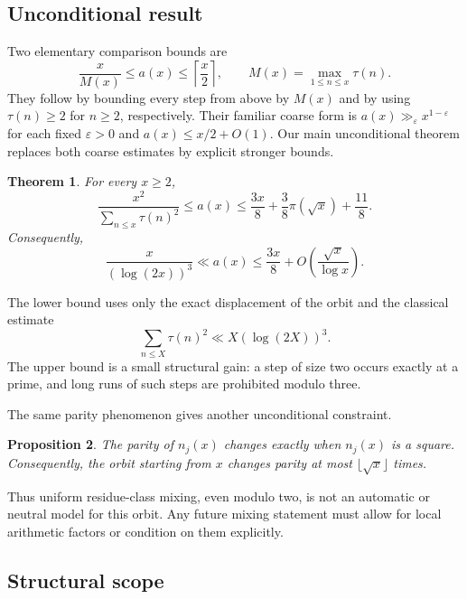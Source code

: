 \documentclass[11pt]{article}
\newtheorem{theorem}{Theorem}[section]
\newtheorem{proposition}[theorem]{Proposition}
\theoremstyle{definition}
\theoremstyle{remark}
\begin{document}
\subsection{Unconditional result}

Two elementary comparison bounds are
\[
 \frac{x}{M(x)}\leq a(x)\leq\left\lceil\frac{x}{2}\right\rceil,
 \qquad
 M(x)=\max_{1\leq n\leq x}\tau(n).
\]
They follow by bounding every step from above by $M(x)$ and by using
$\tau(n)\geq2$ for $n\geq2$, respectively.  Their familiar coarse form
is $a(x)\gg_\varepsilon x^{1-\varepsilon}$ for each fixed
$\varepsilon>0$ and $a(x)\leq x/2+O(1)$.  Our main unconditional
theorem replaces both coarse estimates by explicit stronger bounds.

\begin{theorem}\label{thm:unconditional}
For every $x\geq 2$,
\begin{equation}\label{eq:unconditional}
 \frac{x^2}{\displaystyle\sum_{n\leq x}\tau(n)^2}
 \leq a(x)
 \leq \frac{3x}{8}+\frac{3}{8}\pi(\sqrt x)+\frac{11}{8}.
\end{equation}
Consequently,
\[
 \frac{x}{(\log(2x))^3}\ll a(x)
 \leq \frac{3x}{8}+O\!\left(\frac{\sqrt x}{\log x}\right).
\]
\end{theorem}

The lower bound uses only the exact displacement of the orbit and the
classical estimate
\begin{equation}\label{eq:second-moment}
 \sum_{n\leq X}\tau(n)^2\ll X(\log(2X))^3.
\end{equation}
The upper bound is a small structural gain: a step of size two occurs
exactly at a prime, and long runs of such steps are prohibited modulo
three.

The same parity phenomenon gives another unconditional constraint.

\begin{proposition}\label{prop:parity}
The parity of $n_j(x)$ changes exactly when $n_j(x)$ is a square.
Consequently, the orbit starting from $x$ changes parity at most
$\lfloor\sqrt x\rfloor$ times.
\end{proposition}

Thus uniform residue-class mixing, even modulo two, is not an automatic
or neutral model for this orbit.  Any future mixing statement must allow
for local arithmetic factors or condition on them explicitly.

\subsection{Structural scope}
\end{document}

